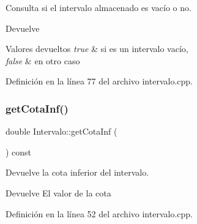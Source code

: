Consulta si el intervalo almacenado es vacío o no. 

\begin{DoxyReturn}{Devuelve}

\end{DoxyReturn}

\begin{DoxyRetVals}{Valores devueltos}
{\em true} & si es un intervalo vacío,\\
\hline
{\em false} & en otro caso \\
\hline
\end{DoxyRetVals}


Definición en la línea 77 del archivo intervalo.\+cpp.


\begin{DoxyCode}{0}

\end{DoxyCode}
\mbox{\label{classIntervalo_aafa3f6ec78c6bd44b568e343fb22fc90}} 
\subsubsection{\texorpdfstring{getCotaInf()}{getCotaInf()}}
{\footnotesize\ttfamily double Intervalo\+::get\+Cota\+Inf (\begin{DoxyParamCaption}{ }\end{DoxyParamCaption}) const}



Devuelve la cota inferior del intervalo. 

\begin{DoxyReturn}{Devuelve}
El valor de la cota 
\end{DoxyReturn}


Definición en la línea 52 del archivo intervalo.\+cpp.


\begin{DoxyCode}{0}

\end{DoxyCode}
\mbox{\label{classIntervalo_a2dd767a860e4e85ec3d5a44e78884b76}} 
